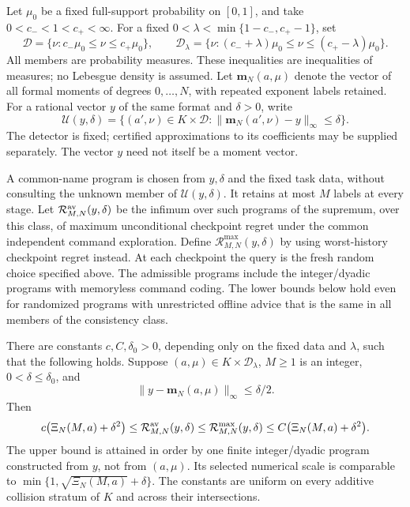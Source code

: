 Let $\mu_0$ be a fixed full-support probability on $[0,1]$, and take
$0<c_-<1<c_+<\infty$. For a fixed
$0<\lambda<\min\{1-c_-,c_+-1\}$, set
\[
 \mathcal D=\{\nu:c_-\mu_0\le\nu\le c_+\mu_0\},\qquad
 \mathcal D_\lambda=
 \{\nu:(c_-+\lambda)\mu_0\le\nu\le(c_+-\lambda)\mu_0\}.
\]
All members are probability measures. These inequalities are inequalities
of measures; no Lebesgue density is assumed. Let $\mathbf m_N(a,\mu)$
denote the vector of all formal moments of degrees $0,\ldots,N$,
with repeated exponent labels retained. For a rational vector $y$ of the
same format and $\delta>0$, write
\begin{equation}\label{eq:moment-consistency-class}
 \mathcal U(y,\delta)=\{(a',\nu)\in K\times\mathcal D:
       \|\mathbf m_N(a',\nu)-y\|_\infty\le\delta\}.
\end{equation}
The detector is fixed; certified approximations to its coefficients may
be supplied separately. The vector $y$ need not itself be a moment vector.

A common-name program is chosen from $y,\delta$ and the fixed task data,
without consulting the unknown member of $\mathcal U(y,\delta)$.
It retains at most $M$ labels at every stage. Let
$\mathcal R_{M,N}^{\rm av}(y,\delta)$ be the infimum over such programs
of the supremum, over this class, of maximum unconditional checkpoint
regret under the common independent command exploration.
Define $\mathcal R_{M,N}^{\max}(y,\delta)$ by using worst-history
checkpoint regret instead. At each checkpoint the query is the fresh
random choice specified above. The admissible programs include the
integer/dyadic programs with memoryless command coding. The lower bounds
below hold even for randomized programs with unrestricted offline advice
that is the same in all members of the consistency class.

\begin{theorem}
\label{thm:sharp-common-moments}
There are constants $c,C,\delta_0>0$, depending only on the fixed data
and $\lambda$, such that the following holds. Suppose
$(a,\mu)\in K\times\mathcal D_\lambda$, $M\ge1$ is an integer,
$0<\delta\le\delta_0$, and
\begin{equation}\label{eq:interior-moment-name}
 \|y-\mathbf m_N(a,\mu)\|_\infty\le\delta/2.
\end{equation}
Then
\begin{equation}\label{eq:sharp-common-moments}
 c\bigl(\Xi_N(M,a)+\delta^2\bigr)
 \le \mathcal R_{M,N}^{\rm av}(y,\delta)
 \le \mathcal R_{M,N}^{\max}(y,\delta)
 \le C\bigl(\Xi_N(M,a)+\delta^2\bigr).
\end{equation}
The upper bound is attained in order by one finite integer/dyadic
program constructed from $y$, not from $(a,\mu)$. Its selected numerical
scale is comparable to
$\min\{1,\sqrt{\Xi_N(M,a)}+\delta\}$.
The constants are uniform on every additive collision stratum of $K$
and across their intersections.
\end{theorem}

